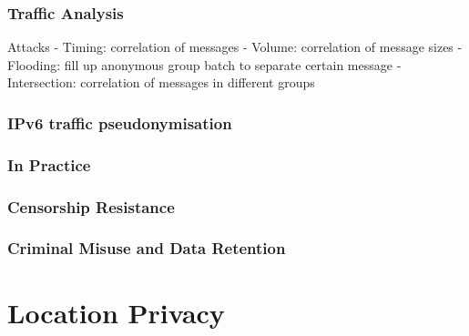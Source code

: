 \documentclass{article}
\begin{document}
\section{Traffic Analysis}
Attacks
- Timing: correlation of messages
- Volume: correlation of message sizes
- Flooding: fill up anonymous group batch to separate certain message
- Intersection: correlation of messages in different groups



% 
\section{IPv6 traffic pseudonymisation}




% 
\section{In Practice}




% 
\section{Censorship Resistance}




% 
\section{Criminal Misuse and Data Retention}



\part{Location Privacy}
\end{document}
